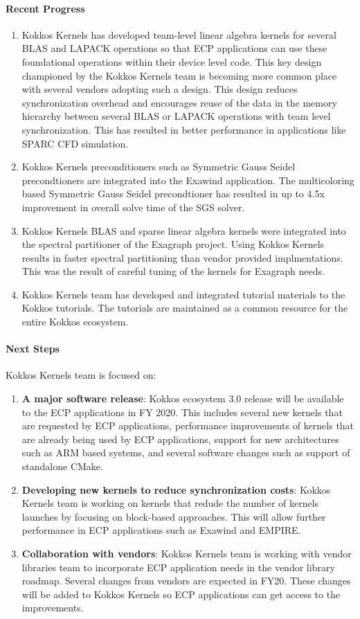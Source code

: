 \paragraph{Recent Progress}
\begin{enumerate}
\item Kokkos Kernels has developed team-level linear algebra kernels for several BLAS and LAPACK
operations so that ECP applications can use these foundational operations within their device level code.
This key design championed by the Kokkos Kernels team is becoming more common place with several
vendors adopting such a design. This design reduces synchronization overhead and encourages reuse
of the data in the memory hierarchy between several BLAS or LAPACK operations with team level
synchronization. This has resulted in better performance in applications like SPARC CFD simulation.  
\item Kokkos Kernels preconditioners such as Symmetric Gauss Seidel precondtioners are integrated
into the Exawind application. The multicoloring based Symmetric Gauss Seidel precondtioner has resulted in
up to 4.5x improvement in overall solve time of the SGS solver. 
\item Kokkos Kernels BLAS and sparse linear algebra kernels were integrated into the spectral partitioner
of the Exagraph project. Using Kokkos Kernels results in faster spectral partitioning than vendor provided
implmentations. This was the result of careful tuning of the kernels for Exagraph needs.
\item Kokkos Kernels team has developed and integrated tutorial materials to the Kokkos tutorials. The
tutorials are maintained as a common resource for the entire Kokkos ecosystem.
\end{enumerate}

\paragraph{Next Steps}

Kokkos Kernels team is focused on:
\begin{enumerate}
	\item \textbf{A major software release}: Kokkos ecosystem 3.0 release 
	will be available to the ECP applications in FY 2020. This includes several new 
	kernels that are requested by ECP applications, performance improvements of
	kernels that are already being used by ECP applications, support for new architectures
	such as ARM based systems, and several software changes such as support of 
	standalone CMake.  
	\item \textbf{Developing new kernels to reduce synchronization costs}: Kokkos Kernels
	team is working on kernels that redude the number of kernels launches by focusing on
	block-based approaches. This will allow further performance in ECP applications
	such as Exawind and EMPIRE.
	\item \textbf{Collaboration with vendors}: Kokkos Kernels team is working with vendor
	libraries team to incorporate ECP application needs in the vendor library roadmap.
	Several changes from vendors are expected in FY20. These changes will be added to
	Kokkos Kernels so ECP applications can get access to the improvements. 
\end{enumerate}
